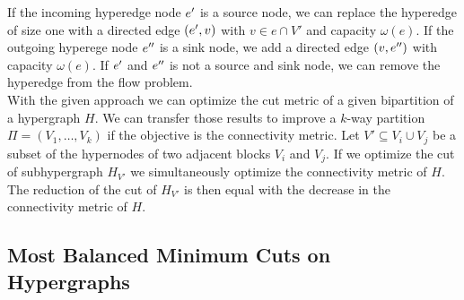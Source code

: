 If the incoming hyperedge node $e'$ is a source node, we can replace the hyperedge of
size one with a directed edge $(e',v)$ with $v \in e \cap V'$ and capacity $\omega(e)$.
If the outgoing hyperege node $e''$ is a sink node, we add a directed edge
$(v,e'')$ with capacity $\omega(e)$. If $e'$ and $e''$ is not a source
and sink node, we can remove the hyperedge from the flow problem. \\
With the given approach we can optimize the cut metric of a given
bipartition of a hypergraph $H$. We can transfer those results to improve
a $k$-way partition $\Pi = (V_1,\ldots,V_k)$ if the objective is the connectivity
metric. Let $V' \subseteq V_i \cup V_j$ be a subset of the hypernodes of two adjacent
blocks $V_i$ and $V_j$. If we optimize the cut of
subhypergraph $H_{V'}$ we simultaneously optimize the connectivity metric of $H$.
The reduction of the cut of $H_{V'}$ is then equal with the decrease in
the connectivity metric of $H$.


\subsection{Most Balanced Minimum Cuts on Hypergraphs}
\label{sec:mbmc_hypergraphs}

